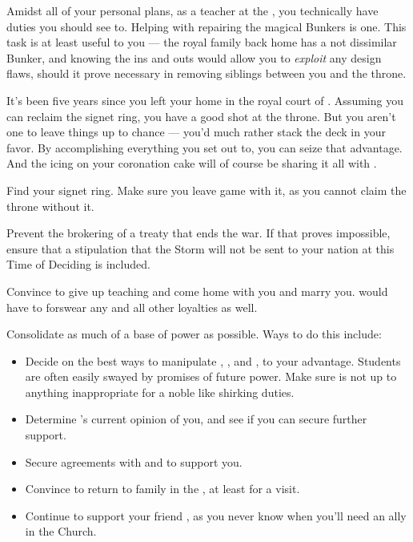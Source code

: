 \documentclass[char]{GL2020}
\begin{document}
Amidst all of your personal plans, as a teacher at the \pSc{}, you technically have duties you should see to. Helping \cBunker{\intro} with repairing the magical Bunkers is one. This task is at least useful to you — the royal family back home has a not dissimilar Bunker, and knowing the ins and outs would allow you to \emph{exploit} any design flaws, should it prove necessary in removing siblings between you and the throne.

It's been five years since you left your home in the royal court of \pFarm{}. Assuming you can reclaim the signet ring, you have a good shot at the throne. But you aren't one to leave things up to chance — you'd much rather stack the deck in your favor. By accomplishing everything you set out to, you can seize that advantage. And the icing on your coronation cake will of course be sharing it all with \cPirate{}.

\begin{itemz}
    \item Find your signet ring. Make sure you leave game with it, as you cannot claim the \pFarm{} throne without it.
    \item Prevent the brokering of a treaty that ends the war. If that proves impossible, ensure that a stipulation that the Storm will not be sent to your nation at this Time of Deciding is included.
    \item Convince \cPirate{} to give up teaching and come home with you and marry you. \cPirate{\They} would have to forswear any and all other loyalties as well.
    \item Consolidate as much of a base of power as possible. Ways to do this include:
     \begin{itemize}
         \item Decide on the best ways to manipulate \cAdopted{}, \cAmbition{}, and \cChupStudent{}, to your advantage. Students are often easily swayed by promises of future power. Make sure \cAdopted{} is not up to anything inappropriate for a noble like shirking \cAdopted{\their} duties.
         \item Determine \cMusic{}’s current opinion of you, and see if you can secure further \cMusic{\formal} support.
         \item Secure agreements with \cAntiChup{} and \cEvil{} to support you.
         \item Convince \cInitiate{} to return to \cInitiate{\their} family in the \pFarm{}, at least for a visit.
         \item Continue to support your friend \cHedonist{}, as you never know when you’ll need an ally in the Church.
   \end{itemize} 
\end{itemz}
\end{document}
